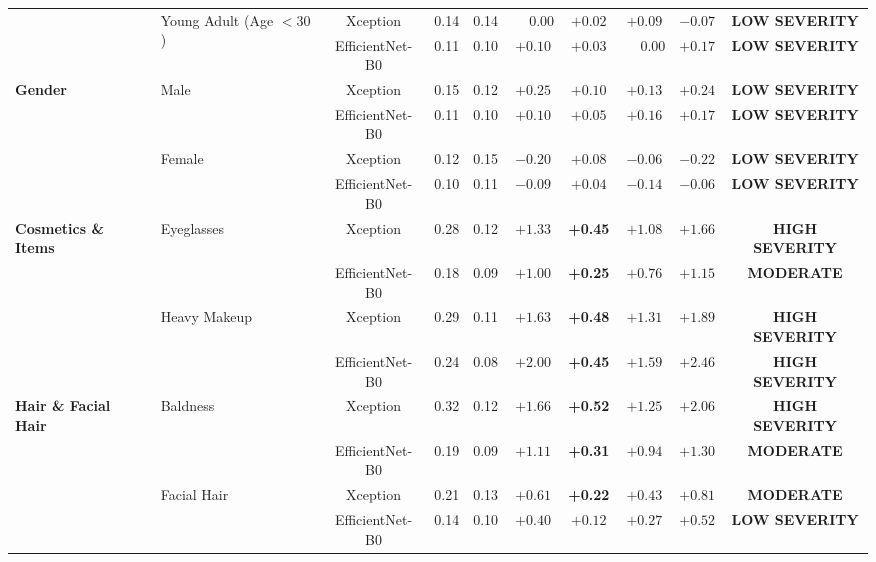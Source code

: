 \documentclass[journal]{IEEEtran}
\begin{document}
\begin{table}[t]
\begin{tabular*}{\textwidth}{@{\extracolsep{\fill}}llcccccccc}
\cmidrule{2-10}
 & \multirow{2}{*}{Young Adult (Age $< 30$)} & Xception & 0.14 & 0.14 & $\phantom{+}0.00$ & $+0.02$ & $+0.09$ & $-0.07$ & \textcolor{sevlow}{\textbf{LOW SEVERITY}} \\
 & & EfficientNet-B0 & 0.11 & 0.10 & $+0.10$ & $+0.03$ & $\phantom{+}0.00$ & $+0.17$ & \textcolor{sevlow}{\textbf{LOW SEVERITY}} \\
\midrule
\multirow{4}{*}{\textbf{Gender}} 
 & \multirow{2}{*}{Male} & Xception & 0.15 & 0.12 & $+0.25$ & $+0.10$ & $+0.13$ & $+0.24$ & \textcolor{sevlow}{\textbf{LOW SEVERITY}} \\
 & & EfficientNet-B0 & 0.11 & 0.10 & $+0.10$ & $+0.05$ & $+0.16$ & $+0.17$ & \textcolor{sevlow}{\textbf{LOW SEVERITY}} \\
\cmidrule{2-10}
 & \multirow{2}{*}{Female} & Xception & 0.12 & 0.15 & $-0.20$ & $+0.08$ & $-0.06$ & $-0.22$ & \textcolor{sevlow}{\textbf{LOW SEVERITY}} \\
 & & EfficientNet-B0 & 0.10 & 0.11 & $-0.09$ & $+0.04$ & $-0.14$ & $-0.06$ & \textcolor{sevlow}{\textbf{LOW SEVERITY}} \\
\midrule
\multirow{4}{*}{\textbf{Cosmetics \& Items}} 
 & \multirow{2}{*}{Eyeglasses} & Xception & 0.28 & 0.12 & $+1.33$ & \textbf{+0.45} & $+1.08$ & $+1.66$ & \textcolor{sevhigh}{\textbf{HIGH SEVERITY}} \\
 & & EfficientNet-B0 & 0.18 & 0.09 & $+1.00$ & \textbf{+0.25} & $+0.76$ & $+1.15$ & \textcolor{sevmod}{\textbf{MODERATE}} \\
\cmidrule{2-10}
 & \multirow{2}{*}{Heavy Makeup} & Xception & 0.29 & 0.11 & $+1.63$ & \textbf{+0.48} & $+1.31$ & $+1.89$ & \textcolor{sevhigh}{\textbf{HIGH SEVERITY}} \\
 & & EfficientNet-B0 & 0.24 & 0.08 & $+2.00$ & \textbf{+0.45} & $+1.59$ & $+2.46$ & \textcolor{sevhigh}{\textbf{HIGH SEVERITY}} \\
\midrule
\multirow{4}{*}{\textbf{Hair \& Facial Hair}} 
 & \multirow{2}{*}{Baldness} & Xception & 0.32 & 0.12 & $+1.66$ & \textbf{+0.52} & $+1.25$ & $+2.06$ & \textcolor{sevhigh}{\textbf{HIGH SEVERITY}} \\
 & & EfficientNet-B0 & 0.19 & 0.09 & $+1.11$ & \textbf{+0.31} & $+0.94$ & $+1.30$ & \textcolor{sevmod}{\textbf{MODERATE}} \\
\cmidrule{2-10}
 & \multirow{2}{*}{Facial Hair} & Xception & 0.21 & 0.13 & $+0.61$ & \textbf{+0.22} & $+0.43$ & $+0.81$ & \textcolor{sevmod}{\textbf{MODERATE}} \\
 & & EfficientNet-B0 & 0.14 & 0.10 & $+0.40$ & $+0.12$ & $+0.27$ & $+0.52$ & \textcolor{sevlow}{\textbf{LOW SEVERITY}} \\
\bottomrule
\end{tabular*}
\end{table}
\end{document}
